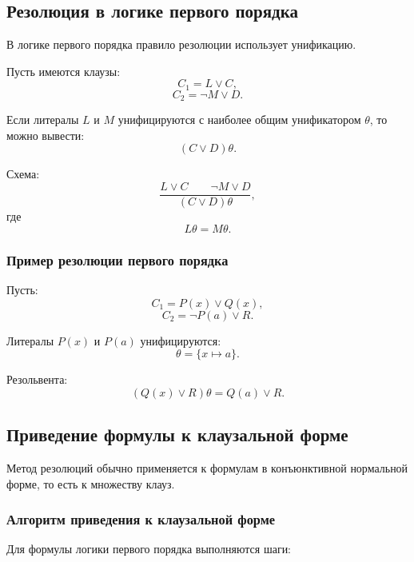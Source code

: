 \documentclass[12pt,a4paper]{article}
\begin{document}
\subsection{Резолюция в логике первого порядка}

В логике первого порядка правило резолюции использует унификацию.

Пусть имеются клаузы:
$$
C_1 = L \lor C,
$$
$$
C_2 = \neg M \lor D.
$$

Если литералы $L$ и $M$ унифицируются с наиболее общим унификатором $\theta$, то можно вывести:
$$
(C \lor D)\theta.
$$

Схема:
$$
\frac{L \lor C \qquad \neg M \lor D}{(C \lor D)\theta},
$$
где
$$
L\theta = M\theta.
$$

\subsubsection{Пример резолюции первого порядка}

Пусть:
$$
C_1 = P(x) \lor Q(x),
$$
$$
C_2 = \neg P(a) \lor R.
$$

Литералы $P(x)$ и $P(a)$ унифицируются:
$$
\theta = \{x \mapsto a\}.
$$

Резольвента:
$$
(Q(x) \lor R)\theta = Q(a) \lor R.
$$

\subsection{Приведение формулы к клаузальной форме}

Метод резолюций обычно применяется к формулам в конъюнктивной нормальной форме, то есть к множеству клауз.

\subsubsection{Алгоритм приведения к клаузальной форме}

Для формулы логики первого порядка выполняются шаги:
\end{document}
